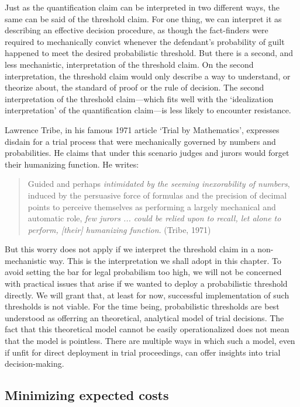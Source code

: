 \documentclass[10pt,dvipsnames,enabledeprecatedfontcommands]{scrartcl}
\begin{document}
Just as the quantification claim can be interpreted in two different
ways, the same can be said of the threshold claim. For one thing, we can
interpret it as describing an effective decision procedure, as though
the fact-finders were required to mechanically convict whenever the
defendant's probability of guilt happened to meet the desired
probabilistic threshold. But there is a second, and less mechanistic,
interpretation of the threshold claim. On the second interpretation, the
threshold claim would only describe a way to understand, or theorize
about, the standard of proof or the rule of decision. The second
interpretation of the threshold claim---which fits well with the
`idealization interpretation' of the quantification claim---is less
likely to encounter resistance.

Lawrence Tribe, in his famous 1971 article `Trial by Mathematics',
expresses disdain for a trial process that were mechanically governed by
numbers and probabilities. He claims that under this scenario judges and
jurors would forget their humanizing function. He writes:

\begin{quote}
Guided and perhaps
\textit{intimidated by the seeming inexorability of numbers}, induced by
the persuasive force of formulas and the precision of decimal points to
perceive themselves as performing a largely mechanical and automatic
role, \textit{few jurors ... 
could be relied upon to recall, let alone to 
perform, [their] humanizing function}. \hspace*{\fill} (Tribe, 1971)
\end{quote}

\noindent But this worry does not apply if we interpret the threshold
claim in a non-mechanistic way. This is the interpretation we shall
adopt in this chapter. To avoid setting the bar for legal probabilism
too high, we will not be concerned with practical issues that arise if
we wanted to deploy a probabilistic threshold directly. We will grant
that, at least for now, successful implementation of such thresholds is
not viable. For the time being, probabilistic thresholds are best
understood as offerring an theoretical, analytical model of trial
decisions. The fact that this theoretical model cannot be easily
operationalized does not mean that the model is pointless. There are
multiple ways in which such a model, even if unfit for direct deployment
in trial proceedings, can offer insights into trial decision-making.

\hypertarget{minimizing-expected-costs}{%
\subsection{Minimizing expected costs}\label{minimizing-expected-costs}}
\end{document}
